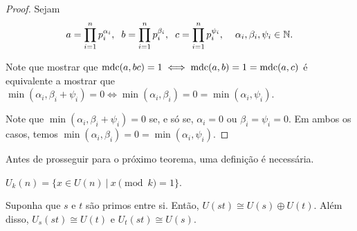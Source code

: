 	\begin{proof}
		Sejam 
		\begin{align*}
        a = \prod_{i = 1}^{n}p_i^{\alpha_i},\hspace{0.2cm}
		b = \prod_{i = 1}^{n}p_i^{\beta_i}, \hspace{0.2cm}
		c = \prod_{i = 1}^{n}p_i^{\psi_i}, \hspace{0.4cm}
		\alpha_i, \beta_i, \psi_i\in\mathbb{N}.
		\end{align*}
		\par\vspace{0.3cm} Note que mostrar que 
		$\operatorname{mdc}(a,bc) = 1 \iff \operatorname{mdc}(a,b) = 1 = \operatorname{mdc}(a,c)$ é equivalente a
		mostrar que 
		$\min(\alpha_i,\beta_i+\psi_i)=0\iff\min(\alpha_i,\beta_i)=0
		=\min(\alpha_i,\psi_i)$.
		\par\vspace{0.3cm} Note que $\min(\alpha_i, \beta_i + \psi_i) = 0$ 
		se, e só se, $\alpha_i = 0$ ou $\beta_i = \psi_i = 0$. Em ambos os
		casos, temos $\min(\alpha_i, \beta_i) = 0 = \min(\alpha_i, \psi_i)$.
	\end{proof}
	\par\vspace{0.3cm} Antes de prosseguir para o próximo teorema, uma
	definição é necessária.
	\begin{definition}
	\label{def U_k(n)}
		$U_k(n) = \{x\in U(n) \ | \ x\pmod k = 1 \}$.
	\end{definition}
	\begin{theorem}
	\label{produto direto}
		Suponha que $s$ e $t$ são primos entre si. Então, 
		$U(st)\cong U(s)\oplus U(t)$. Além disso, $U_s(st)\cong U(t)$ e
		$U_t(st)\cong U(s).$
	\end{theorem}
